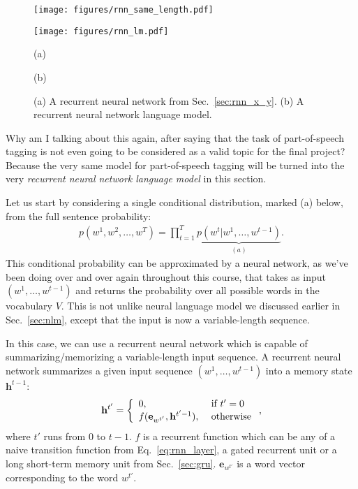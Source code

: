 \documentclass{report}
\newcommand{\vect}[1]{\mathbf{#1}}
\newcommand{\ve}[0]{\vect{e}}
\newcommand{\vh}[0]{\vect{h}}
\begin{document}
\begin{figure}[t]
    \centering
    \begin{minipage}{0.44\textwidth}
        \centering
        \texttt{[image: figures/rnn\_same\_length.pdf]}
    \end{minipage}
    \hfill
    \begin{minipage}{0.55\textwidth}
        \centering
        \texttt{[image: figures/rnn\_lm.pdf]}
    \end{minipage}

    \begin{minipage}{0.44\textwidth}
        \centering
        (a)
    \end{minipage}
    \hfill
    \begin{minipage}{0.55\textwidth}
        \centering
        (b)
    \end{minipage}

    \caption{
        (a) A recurrent neural network from Sec.~\ref{sec:rnn_x_y}. (b) A
        recurrent neural network language model.
    }
    \label{fig:rnn_lm}
\end{figure}

Why am I talking about this again, after saying that the task of part-of-speech
tagging is not even going to be considered as a valid topic for the final
project? Because the very same model for part-of-speech tagging will be turned
into the very {\em recurrent neural network language model} in this section.

Let us start by considering a single conditional distribution, marked (a) below,
from the full sentence probability:
\begin{align*}
    p(w^1, w^2, \ldots, w^T) = \prod_{t=1}^T \underbrace{p(w^t|w^1, \ldots,
    w^{t-1})}_{(a)}.
\end{align*}
This conditional probability can be approximated by a neural network, as we've
been doing over and over again throughout this course, that takes as input
$(w^1, \ldots, w^{t-1})$ and returns the probability over all possible words in
the vocabulary $V$.  This is not unlike neural language model we discussed
earlier in Sec.~\ref{sec:nlm}, except that the input is now a variable-length
sequence.

In this case, we can use a recurrent neural network which is capable of
summarizing/memorizing a variable-length input sequence.  A recurrent neural
network summarizes a given input sequence $(w^1, \ldots, w^{t-1})$ into a memory
state $\vh^{t-1}$:
\begin{align}
    \label{eq:rnnlm_iteration}
    \vh^{t'} = \left\{
        \begin{array}{l l}
            0,&\text{ if }t'=0 \\
            f(\ve_{w^{t'}}, \vh^{t'-1}),&\text{ otherwise}
        \end{array}
        \right.,
\end{align}
where $t'$ runs from $0$ to $t-1$.  $f$ is a recurrent function which can be any
of a naive transition function from Eq.~\eqref{eq:rnn_layer}, a gated recurrent
unit or a long short-term memory unit from Sec.~\ref{sec:gru}. $\ve_{w^{t'}}$ is
a word vector corresponding to the word $w^{t'}$.
\end{document}
